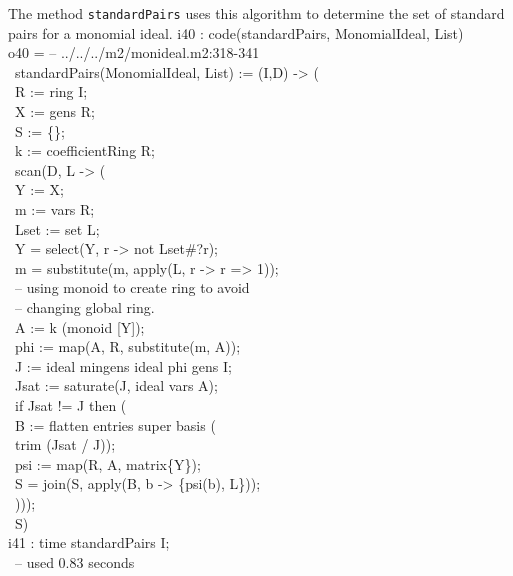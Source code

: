 The method {\tt standardPairs} uses this algorithm to determine the
set of standard pairs for a monomial ideal.
\beginOutput
i40 : code(standardPairs, MonomialIdeal, List)\\
\emptyLine
o40 = -- ../../../m2/monideal.m2:318-341\\
\      standardPairs(MonomialIdeal, List) := (I,D) -> (\\
\           R := ring I;\\
\           X := gens R;\\
\           S := \{\};\\
\           k := coefficientRing R;\\
\           scan(D, L -> ( \\
\                     Y := X;\\
\                     m := vars R;\\
\                     Lset := set L;\\
\                     Y = select(Y, r -> not Lset#?r);\\
\                     m = substitute(m, apply(L, r -> r => 1));\\
\                     -- using monoid to create ring to avoid \\
\                     -- changing global ring.\\
\                     A := k (monoid [Y]);\\
\                     phi := map(A, R, substitute(m, A));\\
\                     J := ideal mingens ideal phi gens I;\\
\                     Jsat := saturate(J, ideal vars A);\\
\                     if Jsat != J then (\\
\                          B := flatten entries super basis (\\
\                               trim (Jsat / J));\\
\                          psi := map(R, A, matrix\{Y\});\\
\                          S = join(S, apply(B, b -> \{psi(b), L\}));\\
\                          )));\\
\           S)\\
\endOutput
\beginOutput
i41 : time standardPairs I;\\
\     -- used 0.83 seconds\\
\endOutput

